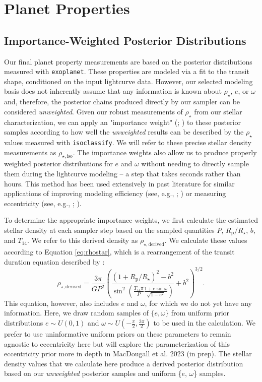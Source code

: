 \documentclass[twocolumn]{aastex63}
\begin{document}
\section{Planet Properties}
\label{sec:planet}

\subsection{Importance-Weighted Posterior Distributions}
\label{sec:impsamp}

Our final planet property measurements are based on the posterior distributions measured with \texttt{exoplanet}. These properties are modeled via a fit to the transit shape, conditioned on the input lightcurve data. However, our selected modeling basis does not inherently assume that any information is known about $\rho_\star$, $e$, or $\omega$ and, therefore, the posterior chains produced directly by our sampler can be considered \textit{unweighted}. Given our robust measurements of $\rho_\star$ from our stellar characterization, we can apply an "importance weight" (\citealt{OhBerger93}; \citealt{Gilks95}) to these posterior samples according to how well the \textit{unweighted} results can be described by the $\rho_\star$ values measured with \texttt{isoclassify}. We will refer to these precise stellar density measurements as $\rho_{\star, \textrm{iso}}$. The importance weights also allow us to produce properly weighted posterior distributions for $e$ and $\omega$ without needing to directly sample them during the lightcurve modeling -- a step that takes seconds rather than hours. This method has been used extensively in past literature for similar applications of improving modeling efficiency (see, e.g., \citealt{Ford05}; \citealt{Ford06}) or measuring eccentricity (see, e.g., \citealt{Dawson12}; \citealt{VE19}).

To determine the appropriate importance weights, we first calculate the estimated stellar density at each sampler step based on the sampled quantities $P$, $R_\textrm{p}/R_\star$, $b$, and $T_{14}$. We refer to this derived density as $\rho_{\star, \textrm{derived}}$. We calculate these values according to Equation \ref{eq:rhostar}, which is a rearrangement of the transit duration equation described by \cite{Winn10}:
%
\begin{equation}
\label{eq:rhostar}
\rho_{\star, \textrm{derived}} = \frac{3 \pi}{G P^2}\left(\frac{\left(1+R_\textrm{p}/R_\star\right)^2-b^2}{\sin^2{\left(\frac{T_{14} \pi}{P}\frac{1+e\sin{\omega}}{\sqrt{1-e^2}}\right)}}+b^2\right)^{3/2}.
\end{equation}
%
This equation, however, also includes $e$ and $\omega$, for which we do not yet have any information. Here, we draw random samples of $\{e, \omega\}$ from uniform prior distributions $e \sim U(0,1)$ and $\omega \sim U(-\frac{\pi}{2},\frac{3\pi}{2})$ to be used in the calculation. We prefer to use uninformative uniform priors on these parameters to remain agnostic to eccentricity here but will explore the parameterization of this eccentricity prior more in depth in MacDougall et al. 2023 (in prep). The stellar density values that we calculate here produce a derived posterior distribution based on our \textit{unweighted} posterior samples and uniform \{$e$, $\omega$\} samples.
\end{document}
